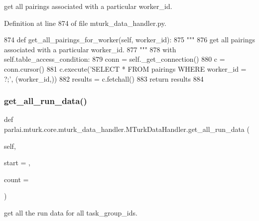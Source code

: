 \begin{DoxyVerb}get all pairings associated with a particular worker_id.
\end{DoxyVerb}
 

Definition at line 874 of file mturk\+\_\+data\+\_\+handler.\+py.


\begin{DoxyCode}
874     \textcolor{keyword}{def }get\_all\_pairings\_for\_worker(self, worker\_id):
875         \textcolor{stringliteral}{"""}
876 \textcolor{stringliteral}{        get all pairings associated with a particular worker\_id.}
877 \textcolor{stringliteral}{        """}
878         with self.table\_access\_condition:
879             conn = self.\_get\_connection()
880             c = conn.cursor()
881             c.execute(\textcolor{stringliteral}{'SELECT * FROM pairings WHERE worker\_id = ?;'}, (worker\_id,))
882             results = c.fetchall()
883             \textcolor{keywordflow}{return} results
884 
\end{DoxyCode}
\mbox{\label{classparlai_1_1mturk_1_1core_1_1mturk__data__handler_1_1MTurkDataHandler_a260b4003fe27797a7e49547db992d06e}} 
\subsubsection{\texorpdfstring{get\+\_\+all\+\_\+run\+\_\+data()}{get\_all\_run\_data()}}
{\footnotesize\ttfamily def parlai.\+mturk.\+core.\+mturk\+\_\+data\+\_\+handler.\+M\+Turk\+Data\+Handler.\+get\+\_\+all\+\_\+run\+\_\+data (\begin{DoxyParamCaption}\item[{}]{self,  }\item[{}]{start = {},  }\item[{}]{count = {} }\end{DoxyParamCaption})}

\begin{DoxyVerb}get all the run data for all task_group_ids.
\end{DoxyVerb}
 

